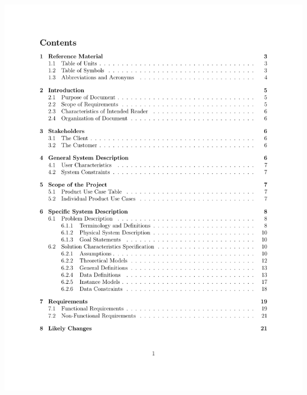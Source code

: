 \documentclass{beamer}
\begin{document}
\begin{frame}


\begin{center}
\includegraphics[scale=0.45]{TofC.pdf}
\end{center}

\end{frame}
\hoffset=0in

\end{document}
